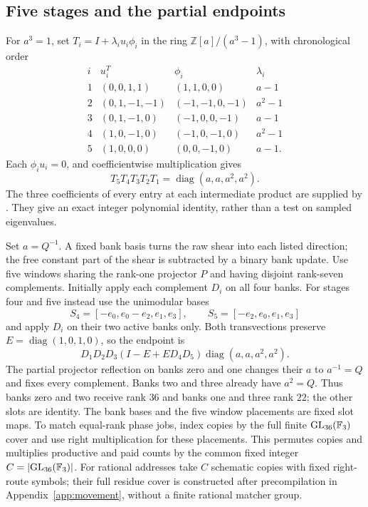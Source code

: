 \subsection{Five stages and the partial endpoints}
For $a^3=1$, set $T_i=I+\lambda_i u_i\phi_i$ in the ring
$\mathbb Z[a]/(a^3-1)$, with chronological order
\[
\begin{array}{c|c|c|c}
i&u_i^T&\phi_i&\lambda_i\\\hline
1&(0,0,1,1)&(1,1,0,0)&a-1\\
2&(0,1,-1,-1)&(-1,-1,0,-1)&a^2-1\\
3&(0,1,-1,0)&(-1,0,0,-1)&a-1\\
4&(1,0,-1,0)&(-1,0,-1,0)&a^2-1\\
5&(1,0,0,0)&(0,0,-1,0)&a-1.
\end{array}
\]
Each $\phi_i u_i=0$, and coefficientwise multiplication gives
\begin{equation}
 T_5T_4T_3T_2T_1=\operatorname{diag}(a,a,a^2,a^2).
 \label{eq:five-bank-word}
\end{equation}
The three coefficients of every entry at each intermediate product
are supplied by .
They give an exact integer polynomial identity, rather than a test
on sampled eigenvalues.

Set $a=Q^{-1}$. A fixed bank basis turns the raw shear into each
listed direction; the free constant part of the shear is subtracted
by a binary bank update. Use five windows sharing the rank-one
projector $P$ and having disjoint rank-seven complements. Initially
apply each complement $D_i$ on all four banks. For stages four and
five instead use the unimodular bases
\[
 S_4=[-e_0,e_0-e_2,e_1,e_3],\qquad
 S_5=[-e_2,e_0,e_1,e_3]
\]
and apply $D_i$ on their two active banks only. Both transvections
preserve $E=\operatorname{diag}(1,0,1,0)$, so the endpoint is
\[
 D_1D_2D_3(I-E+ED_4D_5)\operatorname{diag}(a,a,a^2,a^2).
\]
The partial projector reflection on banks zero and one changes their
$a$ to $a^{-1}=Q$ and fixes every complement. Banks two and three
already have $a^2=Q$. Thus banks zero and two receive rank $36$
and banks one and three rank $22$; the other slots are identity.
The bank bases and the five window placements are fixed slot maps.
To match equal-rank phase jobs, index copies by the full finite
$\mathrm{GL}_{36}(\mathbb F_3)$ cover and use right multiplication for these
placements. This permutes copies and multiplies productive and paid
counts by the common fixed integer $C=|\mathrm{GL}_{36}(\mathbb F_3)|$.
For rational addresses take $C$ schematic copies with fixed right-route
symbols; their full residue cover is constructed after precompilation
in Appendix~\ref{app:movement}, without a finite rational matcher group.

